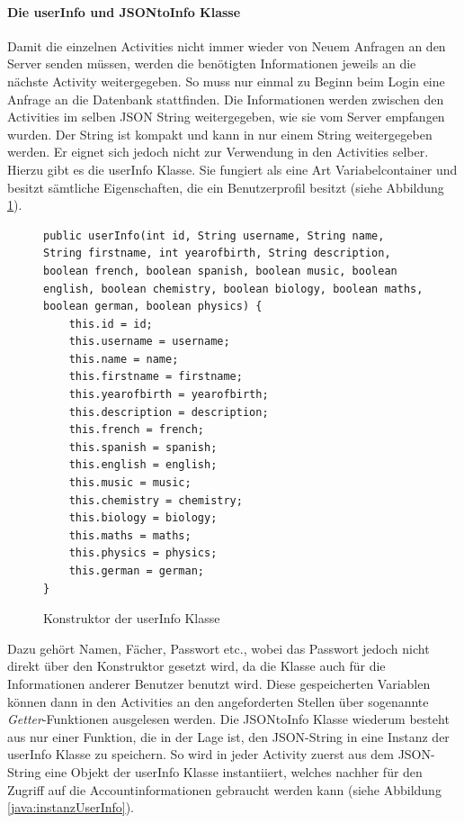 \documentclass[a4paper,11pt]{report}
\begin{document}
				\paragraph{Die userInfo und JSONtoInfo Klasse} \label{userInfo}
				Damit die einzelnen Activities nicht immer wieder von Neuem Anfragen an den Server senden müssen, werden die benötigten Informationen jeweils an die nächste Activity weitergegeben. So muss nur einmal zu Beginn beim Login eine Anfrage an die Datenbank stattfinden. Die Informationen werden zwischen den Activities im selben JSON String weitergegeben, wie sie vom Server empfangen wurden. Der String ist kompakt und kann in nur einem String weitergegeben werden. Er eignet sich jedoch nicht zur Verwendung in den Activities selber. Hierzu gibt es die userInfo Klasse. Sie fungiert als eine Art \glqq Variabelcontainer\grqq{} und besitzt sämtliche Eigenschaften, die ein Benutzerprofil besitzt (siehe Abbildung \ref{java:userInfo}).
\begin{figure}
	\begin{center}
		\begin{verbatim}
public userInfo(int id, String username, String name, String firstname, int yearofbirth, String description, boolean french, boolean spanish, boolean music, boolean english, boolean chemistry, boolean biology, boolean maths, boolean german, boolean physics) {
	this.id = id;
	this.username = username;
	this.name = name;
	this.firstname = firstname;
	this.yearofbirth = yearofbirth;
	this.description = description;
	this.french = french;
	this.spanish = spanish;
	this.english = english;
	this.music = music;
	this.chemistry = chemistry;
	this.biology = biology;
	this.maths = maths;
	this.physics = physics;
	this.german = german;
}
		\end{verbatim}
	\caption{Konstruktor der userInfo Klasse}\label{java:userInfo}
	\end{center}
\end{figure}
				Dazu gehört Namen, Fächer, Passwort etc., wobei das Passwort jedoch nicht direkt über den Konstruktor gesetzt wird, da die Klasse auch für die Informationen anderer Benutzer benutzt wird. Diese gespeicherten Variablen können dann in den Activities an den angeforderten Stellen über sogenannte \emph{Getter}-Funktionen ausgelesen werden. Die JSONtoInfo Klasse wiederum besteht aus nur einer Funktion, die in der Lage ist, den JSON-String in eine Instanz der userInfo Klasse zu speichern. So wird in jeder Activity zuerst aus dem JSON-String eine Objekt der userInfo Klasse instantiiert, welches nachher für den Zugriff auf die Accountinformationen gebraucht werden kann (siehe Abbildung \ref{java:instanzUserInfo}).
\end{document}
